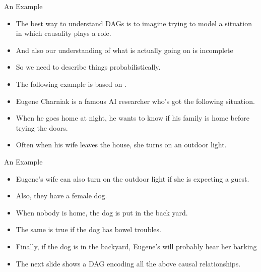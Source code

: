 \documentclass[handout]{beamer}
\begin{document}
\begin{frame}{An Example}
\scriptsize{
\begin{itemize}
\item The best way to understand DAGs is to imagine trying to model a situation in which causality plays a role.
\item And also our understanding of what is actually going on is
incomplete
\item So we need to describe things probabilistically. 

\item The following example is based on \cite{charniak1991bayesian}.

\item Eugene Charniak is a famous AI researcher who's got the following situation.

\item When he goes home at night, he wants to know if his family is home before trying the doors. 

\item Often when his wife leaves the house, she turns on an outdoor light. 

 
\end{itemize}



} 

\end{frame}



\begin{frame}{An Example}
\scriptsize{
\begin{itemize}

\item Eugene's wife can also turn on the outdoor light if she is expecting a guest.

\item Also, they have a female dog. 

\item When nobody is home, the dog is put in the back yard. 

\item The same is true if the dog has bowel troubles. 

\item Finally, if the dog is in the backyard, Eugene's will probably hear her barking 

\item The next slide shows a DAG encoding all the above causal relationships.

 
\end{itemize}



} 

\end{frame}
\end{document}
